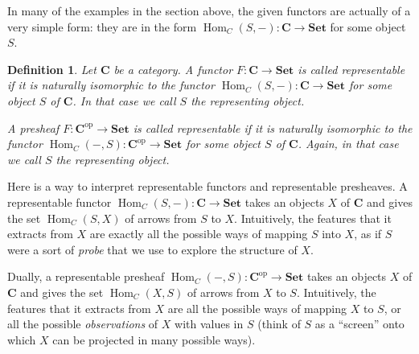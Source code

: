 \documentclass[12pt,oneside]{scrbook}
\numberwithin{equation}{section}
\theoremstyle{plain}
\newtheorem{deph}[thm]{Definition}
\theoremstyle{definition}
\DeclareMathOperator{\Hom}{Hom}
\newcommand{\cat}[1]{{\mathbf{#1}}} %
\newcommand{\op}{\mathrm{op}} %
\newcommand{\Set}{\cat{Set}}
\DeclareMathOperator{\1}{\mathbbm{1}}
\DeclareMathOperator{\2}{\mathbbm{2}}
\begin{document}
In many of the examples in the section above, the given functors are actually of a very simple form: they are in the form $\Hom_{C}(S,-):\cat{C}\to\Set$ for some object $S$. 

\begin{deph}
 Let $\cat{C}$ be a category. A functor $F:\cat{C}\to\Set$ is called \emph{representable} if it is naturally isomorphic to the functor $\Hom_{C}(S,-):\cat{C}\to\Set$ for some object $S$ of $\cat{C}$. In that case we call $S$ the \emph{representing object}. 
 
 A presheaf $F:\cat{C}^\op\to\Set$ is called \emph{representable} if it is naturally isomorphic to the functor $\Hom_{C}(-,S):\cat{C}^\op\to\Set$ for some object $S$ of $\cat{C}$. Again, in that case we call $S$ the \emph{representing object}. 
\end{deph}

Here is a way to interpret representable functors and representable presheaves. 
A representable functor $\Hom_{C}(S,-):\cat{C}\to\Set$ takes an objects $X$ of $\cat{C}$ and gives the set $\Hom_{C}(S,X)$ of arrows from $S$ to $X$. Intuitively, the features that it extracts from $X$ are exactly all the possible ways of mapping $S$ into $X$, as if $S$ were a sort of \emph{probe} that we use to explore the structure of $X$.

Dually, a representable presheaf $\Hom_{C}(-,S):\cat{C}^\op\to\Set$ takes an objects $X$ of $\cat{C}$ and gives the set $\Hom_{C}(X,S)$ of arrows from $X$ to $S$. Intuitively, the features that it extracts from $X$ are all the possible ways of mapping $X$ to $S$, or all the possible \emph{observations} of $X$ with values in $S$ (think of $S$ as a ``screen'' onto which $X$ can be projected in many possible ways). 
\end{document}
